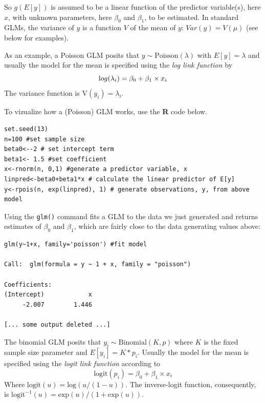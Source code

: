 So $g(E[y])$ is assumed to be a linear function of the
predictor variable(s), here $x$, with unknown parameters, here $\beta_0$ and $\beta_1$, to be
estimated. In standard GLMs,
the variance of $y$ is a function $V$ of the mean of $y$: $Var(y) =
V(\mu)$ (see below for examples).

As an example, a Poisson GLM posits that $y \sim \mbox{Poisson}(\lambda)$ with $E[y]
=\lambda$ and usually the model for the mean is specified using the
{\it log link function} by
\[
{\text log}(\lambda_{i}) = \beta_0 + \beta_{1} \times x_{i}
\]
The variance function is $\mbox{V}(y_{i}) = \lambda_{i}$.  

To vizualize how a (Poisson) GLM works, use the {\bf R} code below.
\begin{verbatim}
set.seed(13)
n=100 #set sample size
beta0<--2 # set intercept term
beta1<- 1.5 #set coefficient
x<-rnorm(n, 0,1) #generate a predictor variable, x
linpred<-beta0+beta1*x # calculate the linear predictor of E[y]
y<-rpois(n, exp(linpred), 1) # generate observations, y, from above model
\end{verbatim} 

Using the {\tt glm()} command fits a GLM to the data we just generated and returns estimates of $\beta_0$ and $\beta_1$, which are fairly close to the data generating values above:
\begin{verbatim}
glm(y~1+x, family='poisson') #fit model

Call:  glm(formula = y ~ 1 + x, family = "poisson")

Coefficients:
(Intercept)            x  
     -2.007        1.446  

[... some output deleted ...]
\end{verbatim}

The
binomial GLM posits that $y_{i} \sim \mbox{Binomial}(K,p)$ where $K$
is the fixed sample size parameter and $E[y_{i}] = K*p_{i}$. Usually
the model for the mean is specified using the {\it logit link
  function} according to
\[
 \text {logit}(p_{i}) = \beta_{0} + \beta_{1} \times x_{i}
\]
Where $\text {logit}(u) = \text {log}(u/(1-u))$.  The inverse-logit function,
consequently, is $\text {logit}^{-1}(u) =
\text {exp}(u)/(1+\text {exp}(u))$.

